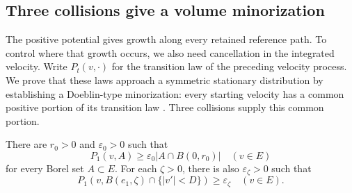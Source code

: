 \subsection{Three collisions give a volume minorization}

The positive potential gives growth along every retained reference
path. To control where that growth occurs, we also need cancellation in
the integrated velocity. Write \(P_t(v,\cdot)\) for the transition law
of the preceding velocity process. We prove that these laws approach a
symmetric stationary distribution by establishing a Doeblin-type
minorization: every starting velocity has a common positive portion of
its transition law \cite{Doeblin1940}. Three collisions supply this
common portion.

\begin{lemma}\label{br:minorization}
There are \(r_0>0\) and \(\varepsilon_0>0\) such that
\begin{equation}\label{br:doeblin}
P_1(v,A)\ge\varepsilon_0|A\cap B(0,r_0)|\quad(v\in E)
\end{equation}
for every Borel set \(A\subset E\). For each \(\zeta>0\), there is also
\(\varepsilon_\zeta>0\) such that
\[
P_1(v,B(e_1,\zeta)\cap\{|v'|<D\})\ge\varepsilon_\zeta\quad(v\in E).
\]
\end{lemma}

